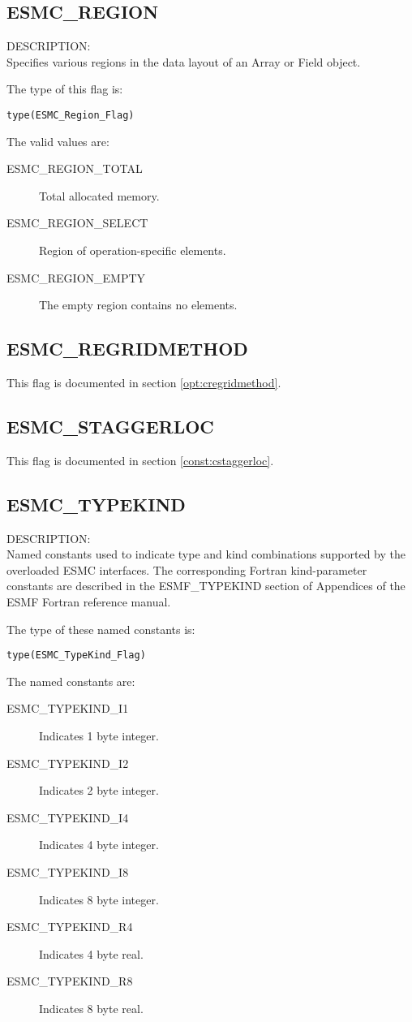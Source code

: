 \subsection{ESMC\_REGION}
\label{const:cregion}
{\sf DESCRIPTION:\\}
Specifies various regions in the data layout of an Array or Field object.

The type of this flag is:

{\tt type(ESMC\_Region\_Flag)}

The valid values are:
\begin{description}
\item [ESMC\_REGION\_TOTAL]
      Total allocated memory.
\item [ESMC\_REGION\_SELECT]
      Region of operation-specific elements.
\item [ESMC\_REGION\_EMPTY]
      The empty region contains no elements.
\end{description}

\subsection{ESMC\_REGRIDMETHOD}
This flag is documented in section \ref{opt:cregridmethod}.

\subsection{ESMC\_STAGGERLOC}
This flag is documented in section \ref{const:cstaggerloc}.

\subsection{ESMC\_TYPEKIND}
\label{const:ctypekind}

{\sf DESCRIPTION:\\}
Named constants used to indicate type and kind combinations supported by the
overloaded ESMC interfaces. The corresponding Fortran kind-parameter constants 
are described in the ESMF\_TYPEKIND section of Appendices of the ESMF Fortran 
reference manual.

The type of these named constants is:

{\tt type(ESMC\_TypeKind\_Flag)}

The named constants are:
\begin{description}
\item [ESMC\_TYPEKIND\_I1]
      Indicates 1 byte integer.
\item [ESMC\_TYPEKIND\_I2]
      Indicates 2 byte integer.
\item [ESMC\_TYPEKIND\_I4]
      Indicates 4 byte integer.
\item [ESMC\_TYPEKIND\_I8]
      Indicates 8 byte integer.
\item [ESMC\_TYPEKIND\_R4]
      Indicates 4 byte real.
\item [ESMC\_TYPEKIND\_R8]
      Indicates 8 byte real.
\end{description}

